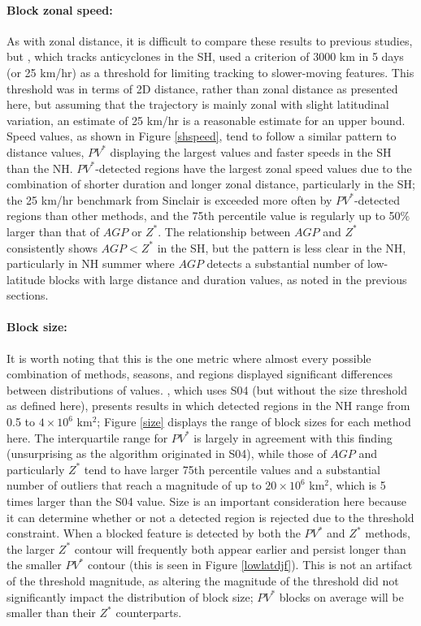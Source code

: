 \documentclass[smallextended]{svjour3}       %
\numberwithin{equation}{section}
\begin{document}
\paragraph{Block zonal speed:} As with zonal distance, it is difficult to compare these results to previous studies, but \cite{sinclair_climatology_1996}, which tracks anticyclones in the SH, used a criterion of 3000 km in 5 days (or 25 km/hr) as a threshold for limiting tracking to slower-moving features. This threshold was in terms of 2D distance, rather than zonal distance as presented here, but assuming that the trajectory is mainly zonal with slight latitudinal variation, an estimate of 25 km/hr is a reasonable estimate for an upper bound. Speed values, as shown in Figure \ref{shspeed}, tend to follow a similar pattern to distance values, $PV^*$ displaying the largest values and faster speeds in the SH than the NH.  $PV^*$-detected regions have the largest zonal speed values due to the combination of shorter duration and longer zonal distance, particularly in the SH; the 25 km/hr benchmark from Sinclair is exceeded more often by $PV^*$-detected regions than other methods, and the 75th percentile value is regularly up to 50\% larger than that of $AGP$ or $Z^*$. The relationship between $AGP$ and $Z^*$ consistently shows $AGP<Z^*$ in the SH, but the pattern is less clear in the NH, particularly in NH summer where $AGP$ detects a substantial number of low-latitude blocks with large distance and duration values, as noted in the previous sections.

\paragraph{Block size:}It is worth noting that this is the one metric where almost every possible combination of methods, seasons, and regions displayed significant differences between distributions of values. \cite{croci-maspoli_multifaceted_2007}, which uses S04 (but without the size threshold as defined here), presents results in which detected regions in the NH range from 0.5 to $4\times 10^6$ km$^2$; Figure \ref{size} displays the range of block sizes for each method here. The interquartile range for $PV^*$ is largely in agreement with this finding (unsurprising as the algorithm originated in S04), while those of $AGP$ and particularly $Z^*$ tend to have larger 75th percentile values and a substantial number of outliers that reach a magnitude of up to $20\times 10^6$ km$^2$, which is 5 times larger than the S04 value. Size is an important consideration here because it can determine whether or not a detected region is rejected due to the threshold constraint. When a blocked feature is detected by both the $PV^*$ and $Z^*$ methods, the larger $Z^*$ contour will frequently both appear earlier and persist longer than the smaller $PV^*$ contour (this is seen in Figure \ref{lowlatdjf}). This is not an artifact of the threshold magnitude, as altering the magnitude of the threshold did not significantly impact the distribution of block size; $PV^*$ blocks on average will be smaller than their $Z^*$ counterparts.
\end{document}
